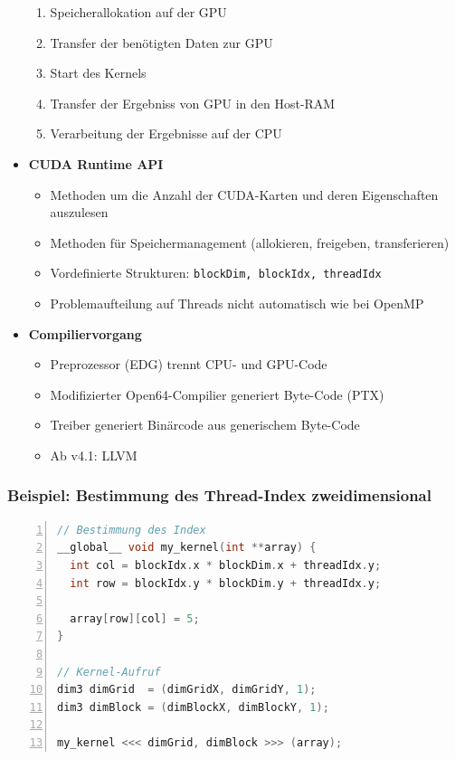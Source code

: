 \begin{itemize}
\begin{enumerate}
		\item Speicherallokation auf der GPU
		\item Transfer der benötigten Daten zur GPU
		\item Start des Kernels
		\item Transfer der Ergebniss von GPU in den Host-RAM
		\item Verarbeitung der Ergebnisse auf der CPU
	\end{enumerate}
	\item \textbf{CUDA Runtime API}
	\begin{itemize}
		\item Methoden um die Anzahl der CUDA-Karten und deren Eigenschaften auszulesen
		\item Methoden für Speichermanagement (allokieren, freigeben, transferieren)
		\item Vordefinierte Strukturen: \texttt{blockDim, blockIdx, threadIdx}
		\item Problemaufteilung auf Threads nicht automatisch wie bei OpenMP
	\end{itemize}
	\item \textbf{Compiliervorgang}
	\begin{itemize}
		\item Preprozessor (EDG) trennt CPU- und GPU-Code
		\item Modifizierter Open64-Compilier generiert Byte-Code (PTX)
		\item Treiber generiert Binärcode aus generischem Byte-Code
		\item Ab v4.1: LLVM
	\end{itemize}
\end{itemize}

\subsubsection{Beispiel: Bestimmung des Thread-Index zweidimensional}
\begin{minipage}{\linewidth}
\begin{lstlisting}[frame=single,numbers=left,mathescape,language=C]
// Bestimmung des Index
__global__ void my_kernel(int **array) {
  int col = blockIdx.x * blockDim.x + threadIdx.y;
  int row = blockIdx.y * blockDim.y + threadIdx.y;

  array[row][col] = 5;
}

// Kernel-Aufruf
dim3 dimGrid  = (dimGridX, dimGridY, 1);
dim3 dimBlock = (dimBlockX, dimBlockY, 1);

my_kernel <<< dimGrid, dimBlock >>> (array);
\end{lstlisting}
\end{minipage}

